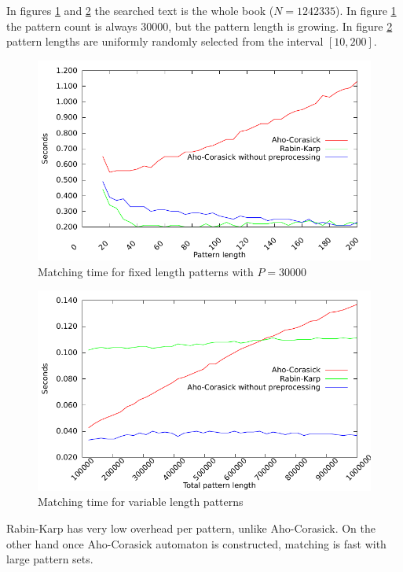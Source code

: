 \documentclass[final]{beamer}
\begin{document}
\begin{poster}
In figures \ref{fig:fixed_len} and \ref{fig:var_len} the searched text is the whole book ($N=1242335$).
In figure \ref{fig:fixed_len} the pattern count is always 30000, but the pattern length is
growing.
In figure \ref{fig:var_len} pattern lengths are uniformly randomly selected from the interval $[10,200]$.

\newcolumn
\begin{figure}
\centering
 \includegraphics[width=23cm]{fixed_len.pdf}
\caption{Matching time for fixed length patterns with $P=30000$}
\label{fig:fixed_len}
\end{figure}
\begin{figure}
{\centering
 \includegraphics[width=23cm]{var_len.pdf}
\caption{Matching time for variable length patterns}
\label{fig:var_len}
}
\end{figure}
\begin{small} 
Rabin-Karp has very low overhead per pattern, unlike Aho-Corasick.
On the other hand once Aho-Corasick automaton is constructed,
matching is fast with large pattern sets.
\end{small}


\end{poster}
\end{document}
